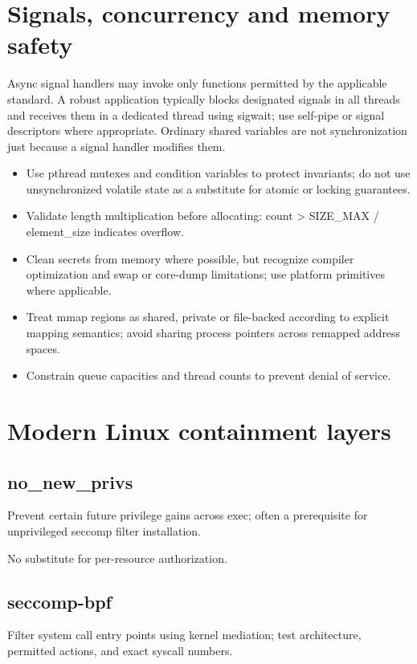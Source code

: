 \documentclass[11pt,letterpaper,oneside]{report}
\begin{document}
\chapter{Signals, concurrency and memory safety}
Async signal handlers may invoke only functions permitted by the applicable standard. A robust application typically blocks designated signals in all threads and receives them in a dedicated thread using sigwait; use self-pipe or signal descriptors where appropriate. Ordinary shared variables are not synchronization just because a signal handler modifies them.

\begin{itemize}
\item Use pthread mutexes and condition variables to protect invariants; do not use unsynchronized volatile state as a substitute for atomic or locking guarantees.
\item Validate length multiplication before allocating: count > SIZE\_MAX / element\_size indicates overflow.
\item Clean secrets from memory where possible, but recognize compiler optimization and swap or core-dump limitations; use platform primitives where applicable.
\item Treat mmap regions as shared, private or file-backed according to explicit mapping semantics; avoid sharing process pointers across remapped address spaces.
\item Constrain queue capacities and thread counts to prevent denial of service.
\end{itemize}
\chapter{Modern Linux containment layers}
\section{no\_new\_privs}
Prevent certain future privilege gains across exec; often a prerequisite for unprivileged seccomp filter installation.

\begin{modernnote}
No substitute for per-resource authorization.
\end{modernnote}
\section{seccomp-bpf}
Filter system call entry points using kernel mediation; test architecture, permitted actions, and exact syscall numbers.
\end{document}
